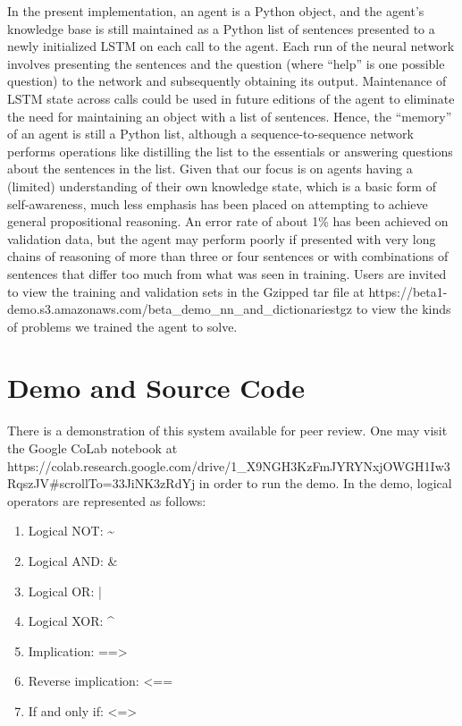 \documentclass{article}
\begin{document}
In the present implementation, an agent is a Python object, and the agent’s knowledge base is still maintained as a Python list of sentences presented to a newly initialized LSTM on each call to the agent. Each run of the neural network involves presenting the sentences and the question (where “help” is one possible question) to the network and subsequently obtaining its output. Maintenance of LSTM state across calls could be used in future editions of the agent to eliminate the need for maintaining an object with a list of sentences. Hence, the “memory” of an agent is still a Python list, although a sequence-to-sequence network performs operations like distilling the list to the essentials or answering questions about the sentences in the list.
Given that our focus is on agents having a (limited) understanding of their own knowledge state, which is a basic form of self-awareness, much less emphasis has been placed on attempting to achieve general propositional reasoning. An error rate of about 1\% has been achieved on validation data, but the agent may perform poorly if presented with very long chains of reasoning of more than three or four sentences or with combinations of sentences that differ too much from what was seen in training. Users are invited to view the training and validation sets in the Gzipped tar file at https://beta1-demo.s3.amazonaws.com/beta\_demo\_nn\_and\_dictionaries\.tgz to view the kinds of problems we trained the agent to solve.

\section{Demo and Source Code}

There is a demonstration of this system available for peer review. One may visit the Google CoLab notebook at https://colab.research.google.com/drive/1\_X9NGH3KzFmJYRYNxjOWGH1Iw3RqszJV\#scrollTo=33JiNK3zRdYj in order to run the demo.
In the demo, logical operators are represented as follows:

\begin{enumerate}
	\item Logical NOT: \textasciitilde
	\item Logical AND: \&
	\item Logical OR: |
	\item Logical XOR: \textasciicircum
	\item Implication: ==\textgreater
	\item Reverse implication: \textless==
	\item If and only if: \textless=\textgreater
\end{enumerate}
\end{document}
